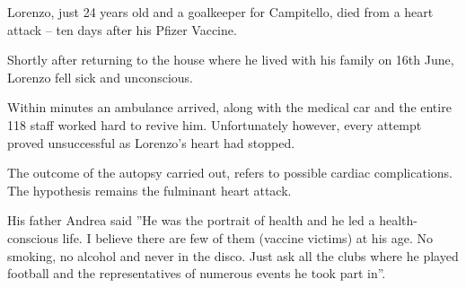 Lorenzo, just 24 years old and a goalkeeper for Campitello, died from a heart
attack – ten days after his Pfizer Vaccine.

Shortly after returning to the house where he lived with his family on 16th
June, Lorenzo fell sick and unconscious.

Within minutes an ambulance arrived, along with the medical car and the entire
118 staff worked hard to revive him. Unfortunately however, every attempt proved
unsuccessful as Lorenzo’s heart had stopped.

The outcome of the autopsy carried out, refers to possible cardiac
complications. The hypothesis remains the fulminant heart attack.

His father Andrea said ”He was the portrait of health and he led a
health-conscious life. I believe there are few of them (vaccine victims) at his
age. No smoking, no alcohol and never in the disco. Just ask all the clubs where
he played football and the representatives of numerous events he took part in”.

